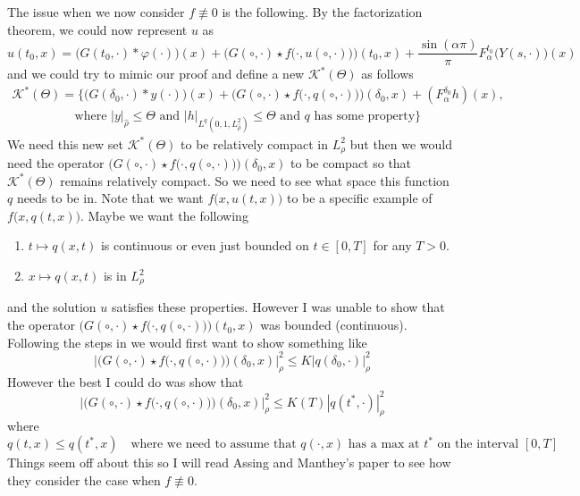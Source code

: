 \documentclass[a4paper,11pt]{article}
\theoremstyle{plain}
\theoremstyle{definition}
\numberwithin{NQ}{section}
\numberwithin{LQ}{section}
\numberwithin{ZQ}{section}
\begin{document}
The issue when we now consider $f\not \equiv 0$ is the following. By the factorization theorem, we could now represent $u$ as 
$$ u(t_0,x)=\big( G(t_0,\cdot)*\varphi(\cdot) \big)(x) + \bigg(G(\circ,\cdot)\star f\big(\cdot,u(\circ,\cdot)\big) \bigg)(t_0,x) +\dfrac{\sin(\alpha \pi)}{\pi}F_\alpha^{t_0}\big(Y(s,\cdot)\big)(x) $$ 
and we could try to mimic our proof and define a new $\mathscr K^*(\Theta)$ as follows 
\begin{align*} \mathscr K^* (\Theta) = \bigg\{ \big(G(\delta_0,\cdot)*y(\cdot)\big)(x)+ \bigg(G(\circ,\cdot)\star f\big(\cdot,q(\circ,\cdot)\big) \bigg)(\delta_0,x) +(F^{\delta_0}_\alpha h)(x), \quad \\ \hspace{5em}\text{where $|y|_{\hat\rho} \le \Theta$  and  $|h|_{L^q(0,1,L^2_{\hat \rho})} \le \Theta $  and   $q$ has some property} \bigg\} \end{align*}
We need this new set $\mathscr{K}^* (\Theta)$ to be relatively compact in $L^2_\rho$ but then we would need the operator $\bigg(G(\circ,\cdot)\star f\big(\cdot,q(\circ,\cdot)\big) \bigg)(\delta_0,x)$ to be compact so that $\mathscr K^*(\Theta)$ remains relatively compact. So we need to see what space this function $q$ needs to be in. Note that we want $ f\big(x,u(t,x)\big)$ to be a specific example of $f\big(x,q(t,x)\big)$. Maybe we want the following 
\begin{enumerate}
    \item $t \mapsto q(x,t)$ is continuous or even just bounded on $t \in [0,T]$ for any $T>0$. 
    \item $x \mapsto q(x,t)$ is in $L^2_\rho$
\end{enumerate}
and the solution $u$ satisfies these properties. However I was unable to show that the operator $\bigg(G(\circ,\cdot)\star f\big(\cdot,q(\circ,\cdot)\big) \bigg)(t_0,x)$ was bounded (continuous). Following the steps in  \cite{TessitoreZabczyk98M} we would first want to show something like 
$$ \bigg| \bigg(G(\circ,\cdot)\star f\big(\cdot,q(\circ,\cdot)\big) \bigg)(\delta_0,x) \bigg|_\rho^2 \le K |q(\delta_0,\cdot)|_\rho^2  $$
However the best I could do was show that 
$$ \bigg| \bigg(G(\circ,\cdot)\star f\big(\cdot,q(\circ,\cdot)\big) \bigg)(\delta_0,x) \bigg|_\rho^2 \le K(T) |q(t^*,\cdot)|_\rho^2  $$
where 
$$ q(t,x) \le q(t^*,x) \quad \text{where we need to assume that $q(\cdot,x)$ has a max at $t^*$ on the interval $[0,T]$} $$
Things seem off about this so I will read Assing and Manthey's paper  \cite{AM03} to see how they consider the case when $f \not \equiv 0$. 
\end{document}

